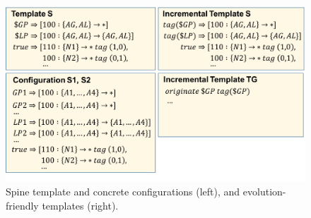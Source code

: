 \documentclass[numbers, 10pt, preprint]{sigplanconf}
\newcommand{\KW}[1]{\texttt{\small\bfseries{#1}}}
\begin{document}
%
%
%
%

\newcommand{\highlight}[1]{%
  \colorbox{red!50}{$\displaystyle#1$}}
\newcommand{\Router}[1]{\KW{Router} #1:}
\newcommand{\Template}[1]{\KW{Template} #1:}
\newcommand{\REGEX}[1]{\texttt{regex}(#1)}
\newcommand{\PEER}{\texttt{peer}}
\newcommand{\PREFIX}{\texttt{prefix}}
\newcommand{\IF}{\texttt{if}}
\newcommand{\THEN}{\texttt{then}}
\newcommand{\COMM}{\texttt{comm}}
\newcommand{\MED}{\texttt{MED}}
\newcommand{\Arrow}{\ensuremath{\leftarrow}}

\begin{figure}[t!]


  \begin{center}
  \includegraphics[width=\columnwidth]{figures/configs}
  \end{center}
  \vspace{-1em}
  \caption{Spine template and concrete configurations (left), and evolution-friendly templates (right).}
  \label{fig:bgp-configs}
\end{figure}
\end{document}
